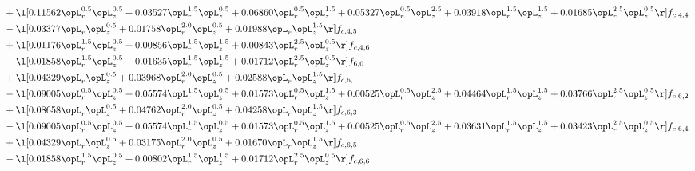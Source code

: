 \begin{alignat}{2}
& + \l[  0.11562 \opL_r^{0.5} \opL_z^{0.5} +  0.03527 \opL_r^{1.5} \opL_z^{0.5} +  0.06860 \opL_r^{0.5} \opL_z^{1.5} +  0.05327 \opL_r^{0.5} \opL_z^{2.5} +  0.03918 \opL_r^{1.5} \opL_z^{1.5} +  0.01685 \opL_r^{2.5} \opL_z^{0.5}  \r] f_{c,4,4} \nonumber \\ 
& - \l[  0.03377 \opL_r \opL_z^{0.5} +  0.01758 \opL_r^{2.0} \opL_z^{0.5} +  0.01988 \opL_r \opL_z^{1.5}  \r] f_{c,4,5} \nonumber \\ 
& + \l[  0.01176 \opL_r^{1.5} \opL_z^{0.5} +  0.00856 \opL_r^{1.5} \opL_z^{1.5} +  0.00843 \opL_r^{2.5} \opL_z^{0.5}  \r] f_{c,4,6} \nonumber \\ 
& - \l[  0.01858 \opL_r^{1.5} \opL_z^{0.5} +  0.01635 \opL_r^{1.5} \opL_z^{1.5} +  0.01712 \opL_r^{2.5} \opL_z^{0.5}  \r] f_{6,0} \nonumber \\ 
& + \l[  0.04329 \opL_r \opL_z^{0.5} +  0.03968 \opL_r^{2.0} \opL_z^{0.5} +  0.02588 \opL_r \opL_z^{1.5}  \r] f_{c,6,1} \nonumber \\ 
& - \l[  0.09005 \opL_r^{0.5} \opL_z^{0.5} +  0.05574 \opL_r^{1.5} \opL_z^{0.5} +  0.01573 \opL_r^{0.5} \opL_z^{1.5} +  0.00525 \opL_r^{0.5} \opL_z^{2.5} +  0.04464 \opL_r^{1.5} \opL_z^{1.5} +  0.03766 \opL_r^{2.5} \opL_z^{0.5}  \r] f_{c,6,2} \nonumber \\ 
& + \l[  0.08658 \opL_r \opL_z^{0.5} +  0.04762 \opL_r^{2.0} \opL_z^{0.5} +  0.04258 \opL_r \opL_z^{1.5}  \r] f_{c,6,3} \nonumber \\ 
& - \l[  0.09005 \opL_r^{0.5} \opL_z^{0.5} +  0.05574 \opL_r^{1.5} \opL_z^{0.5} +  0.01573 \opL_r^{0.5} \opL_z^{1.5} +  0.00525 \opL_r^{0.5} \opL_z^{2.5} +  0.03631 \opL_r^{1.5} \opL_z^{1.5} +  0.03423 \opL_r^{2.5} \opL_z^{0.5}  \r] f_{c,6,4} \nonumber \\ 
& + \l[  0.04329 \opL_r \opL_z^{0.5} +  0.03175 \opL_r^{2.0} \opL_z^{0.5} +  0.01670 \opL_r \opL_z^{1.5}  \r] f_{c,6,5} \nonumber \\ 
& - \l[  0.01858 \opL_r^{1.5} \opL_z^{0.5} +  0.00802 \opL_r^{1.5} \opL_z^{1.5} +  0.01712 \opL_r^{2.5} \opL_z^{0.5}  \r] f_{c,6,6} \nonumber \\ 
\end{alignat} 


